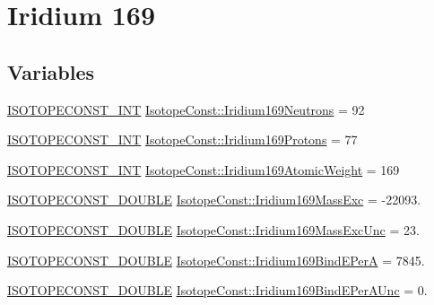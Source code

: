 \hypertarget{group___isotope_const-_iridium-_ir169}{}\section{Iridium 169}
\label{group___isotope_const-_iridium-_ir169}
\subsection*{Variables}
\begin{DoxyCompactItemize}
\item 
\mbox{\hyperlink{group___isotope_const-_macros_ga5f18360b3e99483a35c32d789e62621c}{I\+S\+O\+T\+O\+P\+E\+C\+O\+N\+S\+T\+\_\+\+I\+NT}} \mbox{\hyperlink{group___isotope_const-_iridium-_ir169_gaa83da7e50babdedf4d6fa28b8032120a}{Isotope\+Const\+::\+Iridium169\+Neutrons}} = 92
\item 
\mbox{\hyperlink{group___isotope_const-_macros_ga5f18360b3e99483a35c32d789e62621c}{I\+S\+O\+T\+O\+P\+E\+C\+O\+N\+S\+T\+\_\+\+I\+NT}} \mbox{\hyperlink{group___isotope_const-_iridium-_ir169_gae01019ec672aac7f7d9399dc2bbdf51f}{Isotope\+Const\+::\+Iridium169\+Protons}} = 77
\item 
\mbox{\hyperlink{group___isotope_const-_macros_ga5f18360b3e99483a35c32d789e62621c}{I\+S\+O\+T\+O\+P\+E\+C\+O\+N\+S\+T\+\_\+\+I\+NT}} \mbox{\hyperlink{group___isotope_const-_iridium-_ir169_ga96a23ceb1bc8034e385895eacaa54b19}{Isotope\+Const\+::\+Iridium169\+Atomic\+Weight}} = 169
\item 
\mbox{\hyperlink{group___isotope_const-_macros_ga8f45a7272ce02c0b4c65c44636ed719a}{I\+S\+O\+T\+O\+P\+E\+C\+O\+N\+S\+T\+\_\+\+D\+O\+U\+B\+LE}} \mbox{\hyperlink{group___isotope_const-_iridium-_ir169_ga2578eefb4a033ea592287f074b14b1f1}{Isotope\+Const\+::\+Iridium169\+Mass\+Exc}} = -\/22093.
\item 
\mbox{\hyperlink{group___isotope_const-_macros_ga8f45a7272ce02c0b4c65c44636ed719a}{I\+S\+O\+T\+O\+P\+E\+C\+O\+N\+S\+T\+\_\+\+D\+O\+U\+B\+LE}} \mbox{\hyperlink{group___isotope_const-_iridium-_ir169_ga0c22270d2798ea48db15851a233bc262}{Isotope\+Const\+::\+Iridium169\+Mass\+Exc\+Unc}} = 23.
\item 
\mbox{\hyperlink{group___isotope_const-_macros_ga8f45a7272ce02c0b4c65c44636ed719a}{I\+S\+O\+T\+O\+P\+E\+C\+O\+N\+S\+T\+\_\+\+D\+O\+U\+B\+LE}} \mbox{\hyperlink{group___isotope_const-_iridium-_ir169_gae96bea751158f437c1a4c9b0c944ba78}{Isotope\+Const\+::\+Iridium169\+Bind\+E\+PerA}} = 7845.
\item 
\mbox{\hyperlink{group___isotope_const-_macros_ga8f45a7272ce02c0b4c65c44636ed719a}{I\+S\+O\+T\+O\+P\+E\+C\+O\+N\+S\+T\+\_\+\+D\+O\+U\+B\+LE}} \mbox{\hyperlink{group___isotope_const-_iridium-_ir169_ga7d42b5187590361289ea813ad73378a5}{Isotope\+Const\+::\+Iridium169\+Bind\+E\+Per\+A\+Unc}} = 0.

\end{DoxyCompactItemize}

